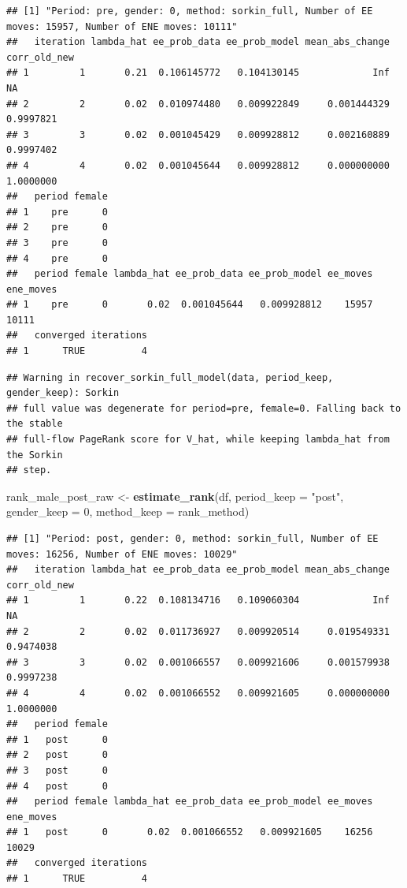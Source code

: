 \documentclass[
]{article}
\newenvironment{Shaded}{\begin{snugshade}}{\end{snugshade}}
\newcommand{\AttributeTok}[1]{\textcolor[rgb]{0.13,0.29,0.53}{#1}}
\newcommand{\DecValTok}[1]{\textcolor[rgb]{0.00,0.00,0.81}{#1}}
\newcommand{\FunctionTok}[1]{\textcolor[rgb]{0.13,0.29,0.53}{\textbf{#1}}}
\newcommand{\NormalTok}[1]{#1}
\newcommand{\OtherTok}[1]{\textcolor[rgb]{0.56,0.35,0.01}{#1}}
\newcommand{\StringTok}[1]{\textcolor[rgb]{0.31,0.60,0.02}{#1}}
\begin{document}
\begin{verbatim}
## [1] "Period: pre, gender: 0, method: sorkin_full, Number of EE moves: 15957, Number of ENE moves: 10111"
##   iteration lambda_hat ee_prob_data ee_prob_model mean_abs_change corr_old_new
## 1         1       0.21  0.106145772   0.104130145             Inf           NA
## 2         2       0.02  0.010974480   0.009922849     0.001444329    0.9997821
## 3         3       0.02  0.001045429   0.009928812     0.002160889    0.9997402
## 4         4       0.02  0.001045644   0.009928812     0.000000000    1.0000000
##   period female
## 1    pre      0
## 2    pre      0
## 3    pre      0
## 4    pre      0
##   period female lambda_hat ee_prob_data ee_prob_model ee_moves ene_moves
## 1    pre      0       0.02  0.001045644   0.009928812    15957     10111
##   converged iterations
## 1      TRUE          4
\end{verbatim}

\begin{verbatim}
## Warning in recover_sorkin_full_model(data, period_keep, gender_keep): Sorkin
## full value was degenerate for period=pre, female=0. Falling back to the stable
## full-flow PageRank score for V_hat, while keeping lambda_hat from the Sorkin
## step.
\end{verbatim}

\begin{Shaded}
\begin{Highlighting}[]
\NormalTok{rank\_male\_post\_raw }\OtherTok{\textless{}{-}} \FunctionTok{estimate\_rank}\NormalTok{(df, }\AttributeTok{period\_keep =} \StringTok{"post"}\NormalTok{, }\AttributeTok{gender\_keep =} \DecValTok{0}\NormalTok{, }\AttributeTok{method\_keep =}\NormalTok{ rank\_method)}
\end{Highlighting}
\end{Shaded}

\begin{verbatim}
## [1] "Period: post, gender: 0, method: sorkin_full, Number of EE moves: 16256, Number of ENE moves: 10029"
##   iteration lambda_hat ee_prob_data ee_prob_model mean_abs_change corr_old_new
## 1         1       0.22  0.108134716   0.109060304             Inf           NA
## 2         2       0.02  0.011736927   0.009920514     0.019549331    0.9474038
## 3         3       0.02  0.001066557   0.009921606     0.001579938    0.9997238
## 4         4       0.02  0.001066552   0.009921605     0.000000000    1.0000000
##   period female
## 1   post      0
## 2   post      0
## 3   post      0
## 4   post      0
##   period female lambda_hat ee_prob_data ee_prob_model ee_moves ene_moves
## 1   post      0       0.02  0.001066552   0.009921605    16256     10029
##   converged iterations
## 1      TRUE          4
\end{verbatim}
\end{document}
